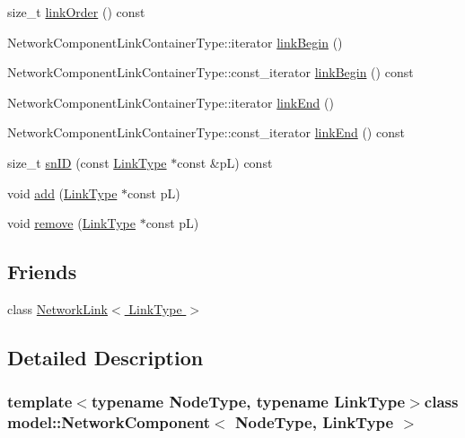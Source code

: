 \begin{DoxyCompactItemize}
\item 
size\+\_\+t \hyperlink{classmodel_1_1_network_component_a363facdfa4885e1aa1765ef7facb5104}{link\+Order} () const 
\item 
Network\+Component\+Link\+Container\+Type\+::iterator \hyperlink{classmodel_1_1_network_component_ad541be1a66e4cabaaf8c8a30134cfba0}{link\+Begin} ()
\item 
Network\+Component\+Link\+Container\+Type\+::const\+\_\+iterator \hyperlink{classmodel_1_1_network_component_a03e03591f3d9ffe8ef1bac854add3917}{link\+Begin} () const 
\item 
Network\+Component\+Link\+Container\+Type\+::iterator \hyperlink{classmodel_1_1_network_component_a01117537a56e1d69691fabf05f58e07a}{link\+End} ()
\item 
Network\+Component\+Link\+Container\+Type\+::const\+\_\+iterator \hyperlink{classmodel_1_1_network_component_a0e87e7f19c562d55f182dfd636d3344d}{link\+End} () const 
\item 
size\+\_\+t \hyperlink{classmodel_1_1_network_component_a2b900b2803633e96a3115d562e3fd3ad}{sn\+I\+D} (const \hyperlink{_spline_node_base__corder0_8h_ab09ccc0af6ea9402dfef7b0eac55cff3}{Link\+Type} $\ast$const \&p\+L) const 
\item 
void \hyperlink{classmodel_1_1_network_component_a10e95d7657cb6b7df099a92220f32850}{add} (\hyperlink{_spline_node_base__corder0_8h_ab09ccc0af6ea9402dfef7b0eac55cff3}{Link\+Type} $\ast$const p\+L)
\item 
void \hyperlink{classmodel_1_1_network_component_a90daf8eaf05a63aed8700d503eb97e7f}{remove} (\hyperlink{_spline_node_base__corder0_8h_ab09ccc0af6ea9402dfef7b0eac55cff3}{Link\+Type} $\ast$const p\+L)
\end{DoxyCompactItemize}
\subsection*{Friends}
\begin{DoxyCompactItemize}
\item 
class \hyperlink{classmodel_1_1_network_component_adabe2abbcc416a859b6d2afa22480684}{Network\+Link$<$ Link\+Type $>$}
\end{DoxyCompactItemize}


\subsection{Detailed Description}
\subsubsection*{template$<$typename Node\+Type, typename Link\+Type$>$class model\+::\+Network\+Component$<$ Node\+Type, Link\+Type $>$}

